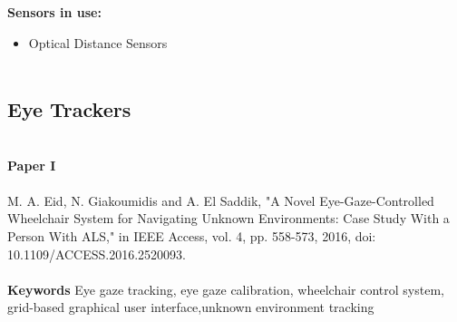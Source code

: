 \noindent
\textbf{Sensors in use:}
\begin{itemize}
    \item Optical Distance Sensors \\ \\
\end{itemize}




\subsection{Eye Trackers}
\noindent
\\ 
\textbf{Paper I} 
\\ \\
\noindent
M. A. Eid, N. Giakoumidis and A. El Saddik, "A Novel Eye-Gaze-Controlled Wheelchair System for Navigating Unknown Environments: Case Study With a Person With ALS," in IEEE Access, vol. 4, pp. 558-573, 2016, doi: 10.1109/ACCESS.2016.2520093.\\ \\

\noindent
\textbf{Keywords} Eye gaze tracking, eye gaze calibration, wheelchair control system, grid-based graphical user interface,unknown environment tracking\\ \\

